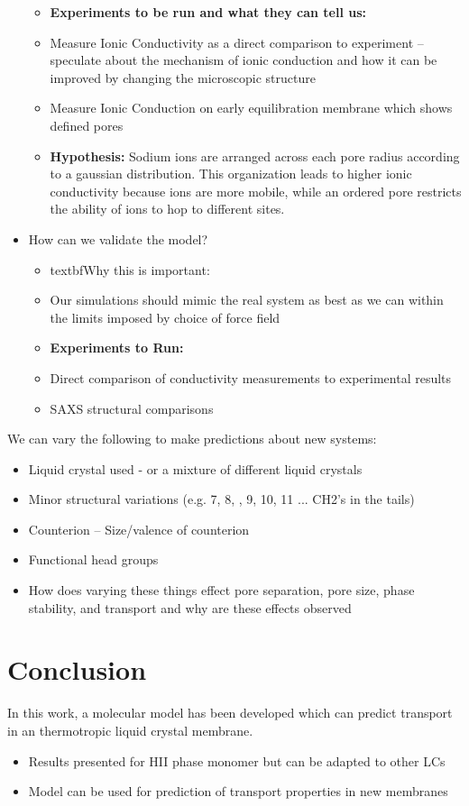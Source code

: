 \documentclass{article}
\begin{document}
\begin{itemize}
\begin{itemize}
			\item \textbf{Experiments to be run and what they can tell us:} 
				\item Measure Ionic Conductivity as a direct comparison to experiment -- speculate about the mechanism of ionic conduction and how it can be improved by changing the microscopic structure
				\item Measure Ionic Conduction on early equilibration membrane which shows defined pores
			\item \textbf{Hypothesis:} Sodium ions are arranged across each pore radius according to a gaussian distribution. This organization leads to higher ionic conductivity because ions are more mobile, while an ordered pore restricts the ability of ions to hop to different sites.
		\end{itemize}
		\item How can we validate the model?
		\begin{itemize}
			\item textbf{Why this is important:}
			\item Our simulations should mimic the real system as best as we can within the limits imposed by choice of force field
			\item \textbf{Experiments to Run:}
			\item Direct comparison of conductivity measurements to experimental results
			\item SAXS structural comparisons
		\end{itemize} 
	\end{itemize}
	We can vary the following to make predictions about new systems:
		\begin{itemize}
			\item Liquid crystal used - or a mixture of different liquid crystals
			\item Minor structural variations (e.g. 7, 8, , 9, 10, 11 ... CH2's in the tails)
			\item Counterion -- Size/valence of counterion
			\item Functional head groups
			\item How does varying these things effect pore separation, pore size, phase stability, and transport and why are these effects observed
		\end{itemize} 
	\section{Conclusion}
	
	In this work, a molecular model has been developed which can predict transport in an thermotropic liquid crystal membrane. 
	\begin{itemize}
		\item Results presented for HII phase monomer but can be adapted to other LCs
		\item Model can be used for prediction of transport properties in new membranes
	\end{itemize}
	
\end{document}
